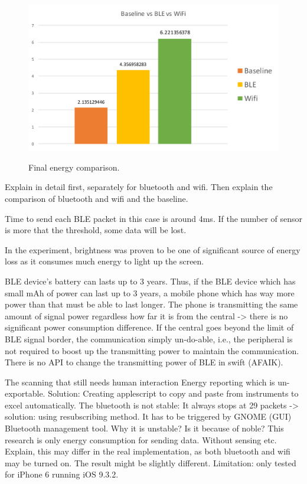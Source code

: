 \documentclass[journal]{vgtc}                %
\begin{document}
\begin{figure}
  \caption{Final energy comparison.}
  \centering
    \includegraphics[width=.5\textwidth]{baseline-ble-wifi}
  \label{fig:baseline-ble-wifi}
\end{figure}

Explain in detail first, separately for bluetooth and wifi.
Then explain the comparison of bluetooth and wifi and the baseline.

Time to send each BLE packet in this case is around 4ms. If the number of sensor is more that the threshold, some data will be lost.

In the experiment, brightness was proven to be one of significant source of energy loss as it consumes much energy to light up the screen.

BLE device's battery can lasts up to 3 years. Thus, if the BLE device which has small mAh of power can last up to 3 years, a mobile phone which has way more power than that must be able to last longer.
The phone is transmitting the same amount of signal power regardless how far it is from the central -> there is no significant power consumption difference. If the central goes beyond the limit of BLE signal border, the communication simply un-do-able, i.e., the peripheral is not required to boost up the transmitting power to maintain the communication.
There is no API to change the transmitting power of BLE in swift (AFAIK).


The scanning that still needs human interaction
Energy reporting which is un-exportable.
Solution: Creating applescript to copy and paste from instruments to excel automatically.
The bluetooth is not stable:
It always stops at 29 packets -> solution: using resubscribing method.
It has to be triggered by GNOME (GUI) Bluetooth management tool.
Why it is unstable?
Is it because of noble?
This research is only energy consumption for sending data. Without sensing etc.
Explain, this may differ in the real implementation, as both bluetooth and wifi may be turned on. The result might be slightly different.
Limitation: only tested for iPhone 6 running iOS 9.3.2.
\end{document}
